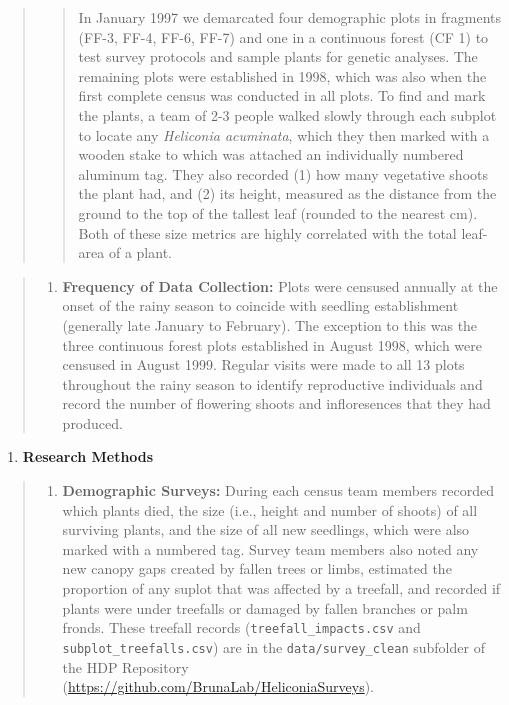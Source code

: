 \documentclass[
  12pt,
  man, donotrepeattitle,floatsintext]{apa6}
\providecommand{\tightlist}{%
  \setlength{\itemsep}{0pt}\setlength{\parskip}{0pt}}
\begin{document}
\begin{quote}
\begin{quote}
In January 1997 we demarcated four demographic plots in fragments (FF-3, FF-4, FF-6, FF-7) and one in a continuous forest (CF 1) to test survey protocols and sample plants for genetic analyses. The remaining plots were established in 1998, which was also when the first complete census was conducted in all plots. To find and mark the plants, a team of 2-3 people walked slowly through each subplot to locate any \emph{Heliconia acuminata}, which they then marked with a wooden stake to which was attached an individually numbered aluminum tag. They also recorded (1) how many vegetative shoots the plant had, and (2) its height, measured as the distance from the ground to the top of the tallest leaf (rounded to the nearest cm). Both of these size metrics are highly correlated with the total leaf-area of a plant.
\end{quote}
\end{quote}

\begin{quote}
\begin{enumerate}
\def\labelenumi{\alph{enumi}.}
\setcounter{enumi}{2}
\tightlist
\item
  \textbf{Frequency of Data Collection:} Plots were censused annually at the onset of the rainy season to coincide with seedling establishment (generally late January to February). The exception to this was the three continuous forest plots established in August 1998, which were censused in August 1999. Regular visits were made to all 13 plots throughout the rainy season to identify reproductive individuals and record the number of flowering shoots and infloresences that they had produced.
\end{enumerate}
\end{quote}

\begin{enumerate}
\def\labelenumi{\arabic{enumi}.}
\setcounter{enumi}{2}
\tightlist
\item
  \textbf{Research Methods}
\end{enumerate}

\begin{quote}
\begin{enumerate}
\def\labelenumi{\alph{enumi}.}
\tightlist
\item
  \textbf{Demographic Surveys:} During each census team members recorded which plants died, the size (i.e., height and number of shoots) of all surviving plants, and the size of all new seedlings, which were also marked with a numbered tag. Survey team members also noted any new canopy gaps created by fallen trees or limbs, estimated the proportion of any suplot that was affected by a treefall, and recorded if plants were under treefalls or damaged by fallen branches or palm fronds. These treefall records (\texttt{treefall\_impacts.csv} and \texttt{subplot\_treefalls.csv}) are in the \texttt{data/survey\_clean} subfolder of the HDP Repository (\url{https://github.com/BrunaLab/HeliconiaSurveys}).
\end{enumerate}
\end{quote}
\end{document}
